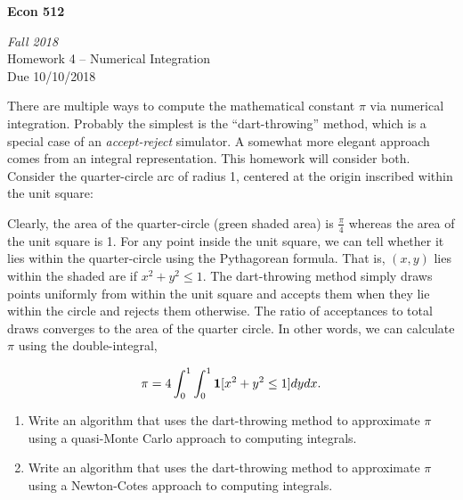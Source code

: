 \documentclass{article}
\newcommand{\ind}[1]{{\bf 1  }[ #1 ] }
\begin{document}
\begin{center}
\textbf{Econ 512}

\emph{Fall 2018}\\[1em]

Homework 4 -- Numerical Integration \\
Due 10/10/2018
\\[3em]
\end{center}

\bigskip

There are multiple ways to compute the mathematical constant $\pi$ via numerical integration. 
Probably the simplest is the ``dart-throwing'' method, which is a special case of an {\it accept-reject}
simulator. A somewhat more elegant approach comes from an integral representation. 
This homework will consider both.
Consider the quarter-circle arc of radius 1, centered at the origin inscribed within the unit square:



\begin{center}
\end{center}

Clearly, the area of the quarter-circle (green shaded area) is $\frac{\pi}{4}$ whereas the area of the unit square is 1.
For any point inside the unit square, we can tell whether it lies within the quarter-circle using the Pythagorean formula. 
That is, $(x,y)$ lies within the shaded are if $x^2 + y^2 \leq 1$. The dart-throwing method simply draws points uniformly from within the unit
square and accepts them when they lie within the circle and rejects them otherwise. The ratio of acceptances to total draws converges
to the area of the quarter circle. In other words, we can calculate $\pi$ using the double-integral,

$$ \pi = 4 \int_0^1 \int_0^1  \ind{ x^2 + y^2 \leq 1} dy dx. $$
 

\begin{enumerate} 

\item Write an algorithm that uses the dart-throwing method to approximate $\pi$ using a quasi-Monte Carlo approach to computing integrals. 

\item Write an algorithm that uses the dart-throwing method to approximate $\pi$ using a Newton-Cotes approach to computing integrals. 

\end{enumerate}
\end{document}
